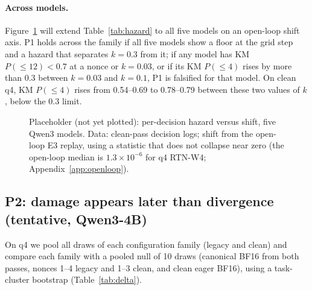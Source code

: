 \paragraph{Across models.} Figure~\ref{fig:hazard} will extend Table~\ref{tab:hazard} to all five models on an open-loop shift axis. P1 holds across the family if all five models show a floor at the grid step and a hazard that separates $k{=}0.3$ from it; if any model has KM $P(\le 12) < 0.7$ at a nonce or $k{=}0.03$, or if its KM $P(\le 4)$ rises by more than 0.3 between $k{=}0.03$ and $k{=}0.1$, P1 is falsified for that model. On clean q4, KM $P(\le 4)$ rises from 0.54--0.69 to 0.78--0.79 between these two values of $k$, below the 0.3 limit.

\begin{figure}[t]
\centering
{}
\caption{Placeholder (not yet plotted): per-decision hazard versus shift, five Qwen3 models. Data: clean-pass decision logs; shift from the open-loop E3 replay, using a statistic that does not collapse near zero (the open-loop median is $1.3\times10^{-6}$ for q4 RTN-W4; Appendix~\ref{app:openloop}).}
\label{fig:hazard}
\end{figure}

\subsection{P2: damage appears later than divergence (tentative, Qwen3-4B)}
\label{sec:p2}

On q4 we pool all draws of each configuration family (legacy and clean) and compare each family with a pooled null of 10 draws (canonical BF16 from both passes, nonces 1--4 legacy and 1--3 clean, and clean eager BF16), using a task-cluster bootstrap (Table~\ref{tab:delta}).

